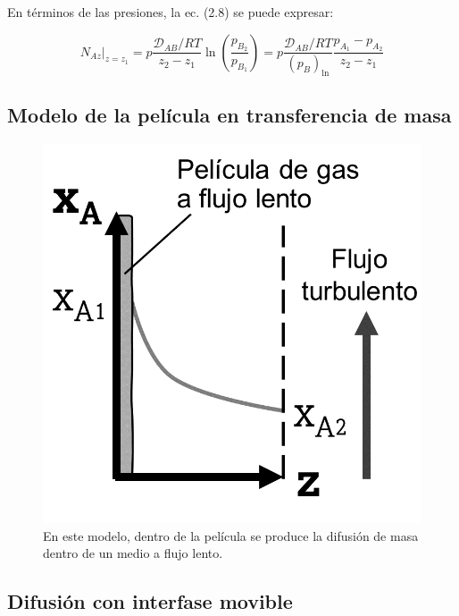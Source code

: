 En términos de las presiones, la ec. (2.8) se puede expresar: 

\begin{equation}
N_{Az}|_{z=z_1} = p \frac{\mathscr{D}_{AB}/RT}{z_2 - z_1} \ln{\left( \frac{p_{B_2}}{p_{B_1}}\right)} = p\frac{\mathscr{D}_{AB}/RT}{(p_B)_{\ln}} \frac{p_{A_1}-p_{A_2}}{z_2 - z_1}
\label{eq_2.10}
\end{equation}


\subsection{Modelo de la película en transferencia de masa}

\begin{figure}[H]
	\centering
	\includegraphics[scale=0.2]{./Capitulo2/Imagenes/fig-2-2.PNG}
	\caption{En este modelo, dentro de la película 		se produce la difusión de masa dentro de un 			medio a flujo lento.}
\end{figure}

\subsection{Difusión con interfase movible}

